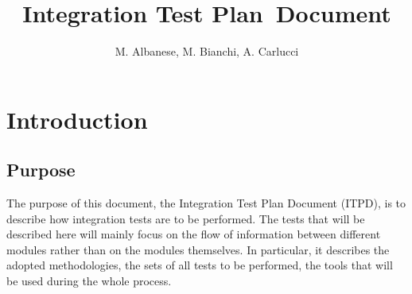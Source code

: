 \documentclass[a4paper, 11pt]{article}
\newcounter{tc}
\begin{document}
\newcommand{\code}[1]{
    \texttt{#1}
}

\newcommand{\testx}[7]{
	\stepcounter{tc}
	\subsection{Test \thetc: #1} %
	
	\begin{tabular}{l p{0.7\textwidth}}
    \hline
    \textbf{Test Case Identifier} & \thetc\\
    \hline
    \textbf{Test Item(s)} & \code{#2} $\rightarrow$ \code{#3}\\
    \hline
    \textbf{Input Specification} & #4\\
    \hline
    \textbf{Output Specification} & #5\\
    \hline
    \textbf{Environmental Needs} & #6\\
    \hline
    \textbf{Test Description} & #7\\
    \hline
	\end{tabular}
}

\title{Integration Test Plan Document}

\author{M. Albanese, M. Bianchi, A. Carlucci}

\maketitle
\newpage{}
\tableofcontents{}

\newpage{}

\section{Introduction}

\subsection{Purpose} 
\label{sub:purpose}
The purpose of this document, the Integration Test Plan Document (ITPD), is to describe how integration tests are to be performed. The tests that will be described here will mainly focus on the flow of information between different modules rather than on the modules themselves.
In particular, it describes the adopted methodologies, the sets of all tests to be performed, the tools that will be used during the whole process.
\end{document}
